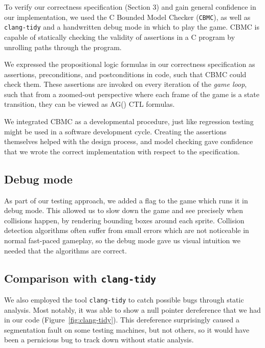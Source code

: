 \documentclass{article}
\newcommand{\cbmc}{\texttt{CBMC}}
\begin{document}
    To verify our correctness specification (Section 3) and gain general
    confidence in our implementation, we used the C Bounded Model Checker
    (\cbmc{}), as well as \texttt{clang-tidy} and a handwritten debug mode in
    which to play the game. CBMC is capable of statically checking the
    validity of assertions in a C program by unrolling paths through the
    program.

    We expressed the propositional logic formulas in our correctness
    specification as assertions, preconditions, and postconditions in code, such
    that CBMC could check them. These assertions are invoked on every iteration
    of the \textit{game loop}, such that from a zoomed-out perspective where
    each frame of the game is a state transition, they can be viewed as AG()
    CTL formulas.

	We integrated CBMC as a developmental procedure, just like regression
    testing might be used in a software development cycle. Creating the
    assertions themselves helped with the design process, and model checking
    gave confidence that we wrote the correct implementation with respect to the
    specification.

    \subsection{Debug mode}

        As part of our testing approach, we added a flag to the game which runs
        it in debug mode. This allowed us to slow down the game and see
        precisely when collisions happen, by rendering bounding boxes around
        each sprite. Collision detection algorithms often suffer from small
        errors which are not noticeable in normal fast-paced gameplay, so the
        debug mode gave us visual intuition we needed that the algorithms are
        correct.

    \subsection{Comparison with \texttt{clang-tidy}}

        We also employed the tool \texttt{clang-tidy} to catch possible bugs
        through static analysis. Most notably, it was able to show a null
        pointer dereference that we had in our code
        (Figure~\ref{fig:clang-tidy}). This dereference surprisingly caused a
        segmentation fault on some testing machines, but not others, so it
        would have been a pernicious bug to track down without static analysis.
\end{document}
